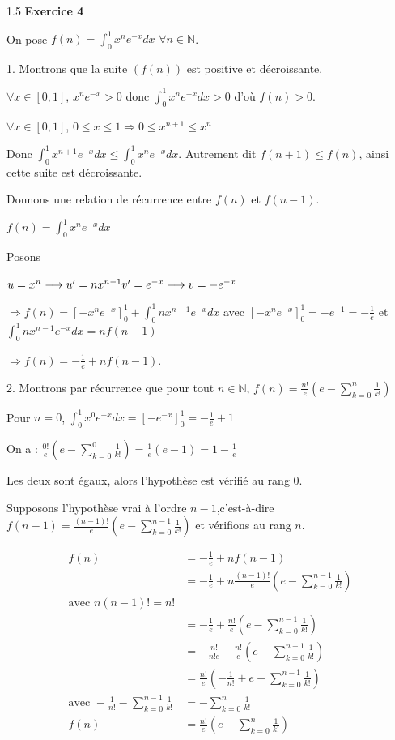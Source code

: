 \documentclass[12pt]{article}
\begin{document}
\begin{spacing}{1.5}
\medskip\textbf{Exercice 4}


On pose $f(n)=\int_{0}^{1}x^ne^{-x}dx$  $\forall n\in \mathbb{N}$.

1. Montrons que la suite $(f(n))$ est positive et décroissante.

$\forall x\in [0,1]$, $x^ne^{-x}>0$ donc $\int_{0}^{1}x^ne^{-x}dx>0$ d'où $f(n)>0$.

$\forall x\in [0,1]$, $0\leq x\leq 1\Rightarrow 0\leq x^{n+1}\leq x^n$

Donc $\int_{0}^{1}x^{n+1}e^{-x}dx\leq \int_{0}^{1}x^ne^{-x}dx$. Autrement dit $f(n+1)\leq f(n)$, ainsi cette suite est décroissante.

\medskip
Donnons une relation de récurrence entre $f(n)$ et $f(n-1)$.
 
 $f(n)=\int_{0}^{1}x^ne^{-x}dx$
 
 Posons 
 

$ u =x^n\longrightarrow u'=nx^{n-1}\\
 v' =e^{-x}\longrightarrow v=-e^{-x}
$ 
 
 $\Rightarrow f(n)=[-x^ne^{-x}]_0^1+\int_{0}^{1}nx^{n-1}e^{-x}dx$ avec $[-x^ne^{-x}]_0^1=-e^{-1}=-\frac{1}{e}$ et $\int_{0}^{1}nx^{n-1}e^{-x}dx=nf(n-1)$
 
 $\Rightarrow f(n)=-\frac{1}{e}+nf(n-1)$.
 
 
 2. Montrons par récurrence que pour tout $n\in \mathbb{N}$, $f(n)= \frac{n!}{e}(e-\sum_{k=0}^{n}\frac{1}{k!})$
 
 Pour $n=0$, $\int_{0}^{1}x^{0}e^{-x}dx=[-e^{-x}]_0^1=-\frac{1}{e}+1$
 
 On a : $\frac{0!}{e}(e-\sum_{k=0}^{0}\frac{1}{k!})=\frac{1}{e}(e-1)=1-\frac{1}{e}$
 
 Les deux sont égaux, alors l'hypothèse est vérifié au rang 0.
 
 Supposons l'hypothèse vrai à l'ordre $n-1$,c'est-à-dire $f(n-1)= \frac{(n-1)!}{e}(e-\sum_{k=0}^{n-1}\frac{1}{k!})$ et vérifions au rang $n$.
 
 \begin{align*}
f(n) &= -\frac{1}{e} + n f(n-1) \\
     &= -\frac{1}{e} + n \frac{(n-1)!}{e} \left( e - \sum_{k=0}^{n-1} \frac{1}{k!} \right) \\
     \text{avec } n(n-1)! = n! \\
     &= -\frac{1}{e} + \frac{n!}{e} \left( e - \sum_{k=0}^{n-1} \frac{1}{k!} \right) \\
     &= -\frac{n!}{n!e} + \frac{n!}{e} \left( e - \sum_{k=0}^{n-1} \frac{1}{k!} \right) \\
     &= \frac{n!}{e} \left( -\frac{1}{n!} + e - \sum_{k=0}^{n-1} \frac{1}{k!} \right) \\
     \text{avec } -\frac{1}{n!} - \sum_{k=0}^{n-1} \frac{1}{k!} &= -\sum_{k=0}^{n} \frac{1}{k!} \\
f(n) &= \frac{n!}{e} \left( e - \sum_{k=0}^{n} \frac{1}{k!} \right)
\end{align*}


\end{spacing}
\end{document}

